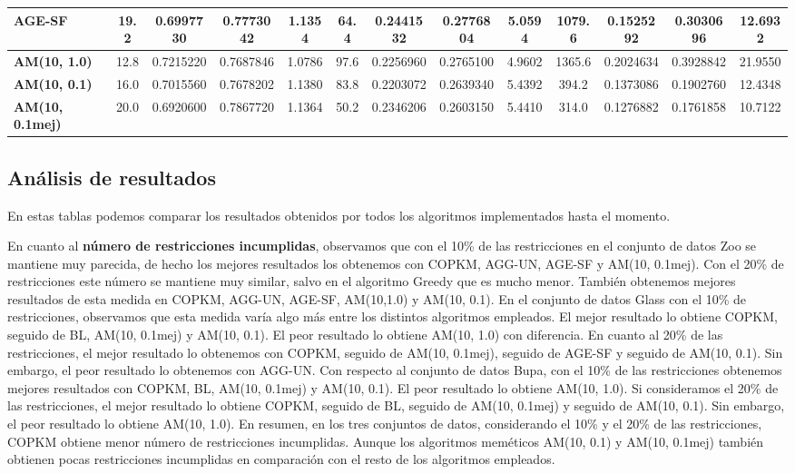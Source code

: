 \begin{table}[H]
\begin{adjustwidth}{-1cm}{-1cm}
\begin{tabular}{|l|c|c|c|c|c|c|c|c|c|c|c|c|}
	\textbf{AGE-SF}    &  19.2 & 	0.6997730	 & 0.7773042 & 	1.1354						 & 	64.4	 & 0.2441532 & 	0.2776804 & 	5.0594 & 	1079.6 & 	0.1525292 & 	0.3030696 & 	12.6932 		\\ \hline
	\textbf{AM(10, 1.0)}    & 12.8 & 	0.7215220 & 	0.7687846	 & 1.0786				 & 	97.6 & 	0.2256960 & 	0.2765100 & 	4.9602 & 	1365.6	 & 0.2024634 & 	0.3928842 & 	21.9550		\\ \hline
	\textbf{AM(10, 0.1)}    & 16.0 & 	0.7015560	 & 0.7678202	 & 1.1380				 & 83.8 & 	0.2203072 & 	0.2639340 & 	5.4392 & 	394.2	 & 0.1373086 & 	0.1902760 & 	12.4348		\\ \hline
	\textbf{AM(10, 0.1mej)}    & 20.0 & 	0.6920600 & 	0.7867720 & 	1.1364				 & 	50.2 & 	0.2346206	 & 0.2603150	 & 5.4410 & 	314.0	 & 0.1276882	 & 0.1761858 & 	10.7122		\\ \hline
	\end{tabular}
	
	\end{adjustwidth}
	
\end{table}

\subsection{Análisis de resultados}

En estas tablas podemos comparar los resultados obtenidos por todos los algoritmos implementados hasta el momento.

En cuanto al \textbf{número de restricciones incumplidas}, observamos que con el 10\% de las restricciones en el conjunto de datos Zoo se mantiene muy parecida, de hecho los mejores resultados los obtenemos con COPKM, AGG-UN, AGE-SF y AM(10, 0.1mej).
Con el 20\% de restricciones este número se mantiene muy  similar, salvo en el algoritmo Greedy que es mucho menor. También obtenemos mejores resultados de esta medida en COPKM, AGG-UN, AGE-SF, AM(10,1.0) y AM(10, 0.1).
En el conjunto de datos Glass con el 10\% de restricciones, observamos que esta medida varía algo más entre los distintos algoritmos empleados. El mejor resultado lo obtiene COPKM, seguido de BL, AM(10, 0.1mej) y AM(10, 0.1). El peor resultado lo obtiene AM(10, 1.0) con diferencia.
En cuanto al 20\% de las restricciones, el mejor resultado lo obtenemos con COPKM, seguido de AM(10, 0.1mej), seguido de AGE-SF y seguido de AM(10, 0.1). Sin embargo, el peor resultado lo obtenemos con AGG-UN.
Con respecto al conjunto de datos Bupa, con el 10\% de las restricciones obtenemos mejores resultados con COPKM, BL, AM(10, 0.1mej) y AM(10, 0.1). El peor resultado lo obtiene AM(10, 1.0).
Si consideramos el 20\% de las restricciones, el mejor resultado lo obtiene  COPKM, seguido de BL, seguido de AM(10, 0.1mej) y seguido de AM(10, 0.1). Sin embargo, el peor resultado lo obtiene AM(10, 1.0).
En resumen, en los tres conjuntos de datos, considerando el 10\% y el 20\% de las restricciones, COPKM obtiene menor número de restricciones incumplidas. Aunque los algoritmos meméticos AM(10, 0.1) y AM(10, 0.1mej) también obtienen pocas restricciones incumplidas en comparación con el resto de los algoritmos empleados.

